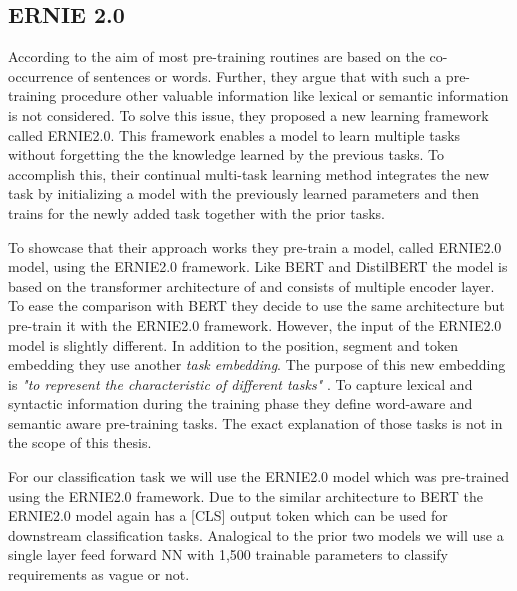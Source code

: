 \subsection{ERNIE 2.0}
\label{chp:approach:sec:models:subsec:ernie2.0}

According to \textcite{Sun:2019a} the aim of most pre-training routines are based on the co-occurrence of sentences or words.
Further, they argue that with such a pre-training procedure other valuable information like lexical or semantic information is not considered.
To solve this issue, they proposed a new learning framework called \ac{ERNIE2.0}.
This framework enables a model to learn multiple tasks without forgetting the the knowledge learned by the previous tasks.
To accomplish this, their continual multi-task learning method integrates the new task by initializing a model with the previously learned parameters and then trains for the newly added task together with the prior tasks.

To showcase that their approach works they pre-train a model, called \ac{ERNIE2.0} model, using the \ac{ERNIE2.0} framework.
Like \ac{BERT} and \ac{DistilBERT} the model is based on the transformer architecture of \textcite{Vaswani:2017} and consists of multiple encoder layer.
To ease the comparison with \ac{BERT} they decide to use the same architecture but pre-train it with the \ac{ERNIE2.0} framework.
However, the input of the \ac{ERNIE2.0} model is slightly different.
In addition to the position, segment and token embedding they use another \textit{task embedding}.
The purpose of this new embedding is \textit{"to represent the characteristic of different tasks"} \parencite{Sun:2019a}.
To capture lexical and syntactic information during the training phase they define word-aware and semantic aware pre-training tasks.
The exact explanation of those tasks is not in the scope of this thesis. \parencite{Sun:2019a}

For our classification task we will use the \ac{ERNIE2.0} model which was pre-trained using the \ac{ERNIE2.0} framework.
Due to the similar architecture to \ac{BERT} the \ac{ERNIE2.0} model again has a [CLS] output token which can be used for downstream classification tasks.
Analogical to the prior two models we will use a single layer feed forward \ac{NN} with 1,500 trainable parameters to classify requirements as vague or not.
